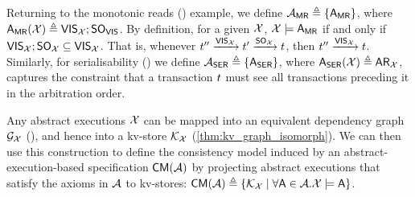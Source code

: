 Returning to the monotonic reads (\MR) example, 
we define \(\mathcal{A}_{\mathsf{MR}} \triangleq \{\mathsf{A}_{\mathsf{MR}}\}\), where \(\mathsf{A}_{\mathsf{MR}}(\mathcal{X}) \triangleq \mathsf{VIS}_{\mathcal{X}} ; \mathsf{SO}_{\mathsf{VIS}}\). 
By definition, for a given \(\mathcal{X}\), \(\mathcal{X} \models \mathsf{A}_{\mathsf{MR}}\) if and only 
if \(\mathsf{VIS}_{\mathcal{X}} ; \mathsf{SO}_{\mathcal{X}} \subseteq \mathsf{VIS}_{\mathcal{X}}\). 
That is, whenever \(t'' \xrightarrow{\mathsf{VIS}_{\mathcal{X}}} t' \xrightarrow{\mathsf{SO}_{\mathcal{X}}} t \), 
then \(t'' \xrightarrow{\mathsf{VIS}_{\mathcal{X}}} t\).
Similarly, for serialisability (\SER) we define \(\mathcal{A}_{\mathsf{SER}} \triangleq \{ \mathsf{A}_{\mathsf{SER}} \}\), where \(\mathsf{A}_{\mathsf{SER}}(\mathcal{X}) \triangleq \mathsf{AR}_{\mathcal{X}}\), 
captures the constraint that a transaction \(t\) must see all transactions
preceding it in the arbitration order.

Any abstract executions \(\mathcal{X}\) can be mapped 
into an equivalent dependency graph \(\mathcal{G}_{\mathcal{X}}\) (\citet{laws}), and hence into a kv-store 
\(\mathcal{K}_{\mathcal{X}}\) (\cref{thm:kv_graph_isomorph}). 
We can then use this construction to define the consistency model induced by an abstract-execution-based specification 
\(\CMs(\Ax)\) by projecting abstract executions that satisfy the axioms in \(\mathcal{A}\) to kv-stores: 
\(\CMs(\Ax) \defeq \{ \hh_{\aexec} \mid \forall \A \in \Ax. \aexec \models \A \}\). 

